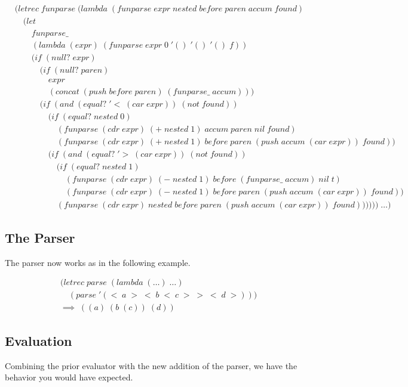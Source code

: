 \begin{align*}
& (letrec \; funparse \; (lambda \; (funparse \; expr \; nested \; before \; paren \; accum \; found) \; 
\\& \quad (let \; 
\\& \qquad funparse\_ \; 
\\& \qquad (lambda \; (expr) \; (funparse \; expr \; 0 \; '() \; '() \; '() \; f))
\\& \qquad (if \; (null? \; expr)
\\& \qquad \quad (if \; (null? \; paren) \; 
\\& \qquad \qquad expr
\\& \qquad \qquad (concat \; (push \; before \; paren) \; (funparse\_ \; accum)))
\\& \qquad \quad (if \; (and \; (equal? \; '< \; (car \; expr)) \; (not \; found))
\\& \qquad \qquad (if \; (equal? \; nested \; 0)
\\& \qquad \qquad \quad (funparse \; (cdr \; expr) \; (+ \; nested \; 1) \; accum \; paren \; nil \; found)
\\& \qquad \qquad \quad (funparse \; (cdr \; expr) \; (+ \; nested \; 1) \; before \; paren \; (push \; accum \; (car \; expr)) \; found))
\\& \qquad \qquad (if \; (and \; (equal? \; '> \; (car \; expr)) \; (not \; found))
\\& \qquad \qquad \quad (if \; (equal? \; nested \; 1)
\\& \qquad \qquad \qquad (funparse \; (cdr \; expr) \; (- \; nested \; 1) \; before \; (funparse\_ \; accum) \; nil \; t)
\\& \qquad \qquad \qquad (funparse \; (cdr \; expr) \; (- \; nested \; 1) \; before \; paren \; (push \; accum \; (car \; expr)) \; found))
\\& \qquad \qquad \quad (funparse \; (cdr \; expr) \; nested \; before \; paren \; (push \; accum \; (car \; expr)) \; found)))))) \; \dots)
\end{align*}

\subsection{The Parser}
The parser now works as in the following example.

\begin{align*}
& (letrec \; parse \; (lambda \; (\dots) \; \dots)
\\& \quad (parse \; '(< \; a \; > \; < \; b \; < \; c \; > \; > \; < \; d \; >)))
\\& \implies \; ((a) \; (b \; (c)) \; (d))
\end{align*}

\subsection{Evaluation}
Combining the prior evaluator with the new addition of the parser, we have the behavior you would have expected.
